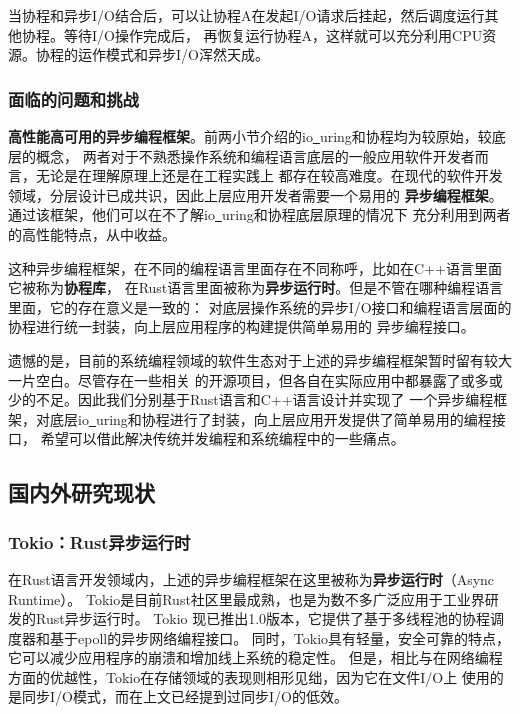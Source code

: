\documentclass[supercite]{HustGraduPaper}
\theoremstyle{definition}
\begin{document}
当协程和异步I/O结合后，可以让协程A在发起I/O请求后挂起，然后调度运行其他协程。等待I/O操作完成后，
再恢复运行协程A，这样就可以充分利用CPU资源。协程的运作模式和异步I/O浑然天成。\par

\subsubsection{面临的问题和挑战}
\textbf{高性能高可用的异步编程框架}。前两小节介绍的io\underline{~}uring和协程均为较原始，较底层的概念，
两者对于不熟悉操作系统和编程语言底层的一般应用软件开发者而言，无论是在理解原理上还是在工程实践上
都存在较高难度。在现代的软件开发领域，分层设计已成共识，因此上层应用开发者需要一个易用的
\textbf{异步编程框架}。通过该框架，他们可以在不了解io\underline{~}uring和协程底层原理的情况下
充分利用到两者的高性能特点，从中收益。\par

这种异步编程框架，在不同的编程语言里面存在不同称呼，比如在C++语言里面它被称为\textbf{协程库}，
在Rust语言里面被称为\textbf{异步运行时}。但是不管在哪种编程语言里面，它的存在意义是一致的：
对底层操作系统的异步I/O接口和编程语言层面的协程进行统一封装，向上层应用程序的构建提供简单易用的
异步编程接口。\par

遗憾的是，目前的系统编程领域的软件生态对于上述的异步编程框架暂时留有较大一片空白。尽管存在一些相关
的开源项目，但各自在实际应用中都暴露了或多或少的不足。因此我们分别基于Rust语言和C++语言设计并实现了
一个异步编程框架，对底层io\underline{~}uring和协程进行了封装，向上层应用开发提供了简单易用的编程接口，
希望可以借此解决传统并发编程和系统编程中的一些痛点。\par

\subsection{国内外研究现状}

\subsubsection{Tokio：Rust异步运行时}
在Rust语言开发领域内，上述的异步编程框架在这里被称为\textbf{异步运行时}（Async Runtime）。
Tokio\cite{repo1}是目前Rust社区里最成熟，也是为数不多广泛应用于工业界研发的Rust异步运行时。
Tokio 现已推出1.0版本，它提供了基于多线程池的协程调度器和基于epoll的异步网络编程接口。
同时，Tokio具有轻量，安全可靠的特点，它可以减少应用程序的崩溃和增加线上系统的稳定性。
但是，相比与在网络编程方面的优越性，Tokio在存储领域的表现则相形见绌，因为它在文件I/O上
使用的是同步I/O模式，而在上文已经提到过同步I/O的低效。\par
\end{document}
